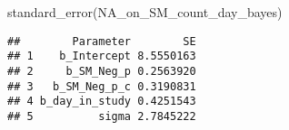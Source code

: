 \documentclass[
]{article}
\newenvironment{Shaded}{\begin{snugshade}}{\end{snugshade}}
\newcommand{\FunctionTok}[1]{\textcolor[rgb]{0.00,0.00,0.00}{#1}}
\newcommand{\NormalTok}[1]{#1}
\begin{document}
\begin{Shaded}
\begin{Highlighting}[]
\FunctionTok{standard\_error}\NormalTok{(NA\_on\_SM\_count\_day\_bayes)}
\end{Highlighting}
\end{Shaded}

\begin{verbatim}
##        Parameter        SE
## 1    b_Intercept 8.5550163
## 2     b_SM_Neg_p 0.2563920
## 3   b_SM_Neg_p_c 0.3190831
## 4 b_day_in_study 0.4251543
## 5          sigma 2.7845222
\end{verbatim}
\end{document}
